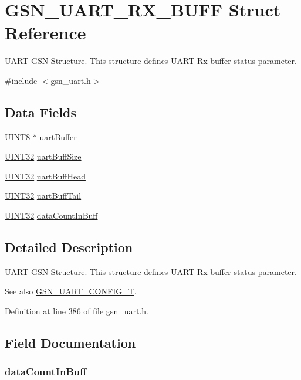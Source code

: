 \hypertarget{a00267}{
\section{GSN\_\-UART\_\-RX\_\-BUFF Struct Reference}
\label{a00267}
}


UART GSN Structure. This structure defines UART Rx buffer status parameter.  




{\ttfamily \#include $<$gsn\_\-uart.h$>$}

\subsection*{Data Fields}
\begin{DoxyCompactItemize}
\item 
\hyperlink{a00660_gab27e9918b538ce9d8ca692479b375b6a}{UINT8} $\ast$ \hyperlink{a00267_abf2bee2b895436869a2c195cd903b51c}{uartBuffer}
\item 
\hyperlink{a00660_gae1e6edbbc26d6fbc71a90190d0266018}{UINT32} \hyperlink{a00267_a7b40e36ac25003b4d00941ab3f8a263a}{uartBuffSize}
\item 
\hyperlink{a00660_gae1e6edbbc26d6fbc71a90190d0266018}{UINT32} \hyperlink{a00267_a5b070dc039f0b2602e5ddf5632f2275c}{uartBuffHead}
\item 
\hyperlink{a00660_gae1e6edbbc26d6fbc71a90190d0266018}{UINT32} \hyperlink{a00267_aae708187345941a786f280aae69fad60}{uartBuffTail}
\item 
\hyperlink{a00660_gae1e6edbbc26d6fbc71a90190d0266018}{UINT32} \hyperlink{a00267_a9e319c58ece6fc0adc5037cea451b24e}{dataCountInBuff}
\end{DoxyCompactItemize}


\subsection{Detailed Description}
UART GSN Structure. This structure defines UART Rx buffer status parameter. 

\begin{DoxySeeAlso}{See also}
\hyperlink{a00656_gab793201a4cc37e8cf27b0b640b1f37bc}{GSN\_\-UART\_\-CONFIG\_\-T}. 
\end{DoxySeeAlso}


Definition at line 386 of file gsn\_\-uart.h.



\subsection{Field Documentation}
\hypertarget{a00267_a9e319c58ece6fc0adc5037cea451b24e}{
\subsubsection[{dataCountInBuff}]{ {\bf dataCountInBuff}}}
\label{a00267_a9e319c58ece6fc0adc5037cea451b24e}


